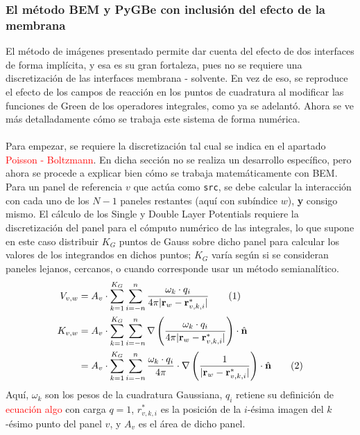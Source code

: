 \documentclass[12pt, notitlepage]{article}
\newcommand\numberthis{\addtocounter{equation}{1}\tag{\theequation}}
\numberwithin{equation}{section}
\begin{document}
\subsubsection{El método BEM y PyGBe con inclusión del efecto de la membrana}
El método de imágenes presentado permite dar cuenta del efecto de dos interfaces de forma implícita, y esa es su gran fortaleza, pues no se requiere una discretización de las interfaces membrana - solvente. En vez de eso, se reproduce el efecto de los campos de reacción en los puntos de cuadratura al modificar las funciones de Green de los operadores integrales, como ya se adelantó. Ahora se ve más detalladamente cómo se trabaja este sistema de forma numérica.\\\\
Para empezar, se requiere la discretización tal cual se indica en el apartado \textcolor{red}{Poisson - Boltzmann}. En dicha sección no se realiza un desarrollo específico, pero ahora se procede a explicar bien cómo se trabaja matemáticamente con BEM. Para un panel de referencia $v$ que actúa como \texttt{src}, se debe calcular la interacción con cada uno de los $N-1$ paneles restantes (aquí con subíndice $w$), \textbf{y} consigo mismo. El cálculo de los Single y Double Layer Potentials requiere la discretización del panel para el cómputo numérico de las integrales, lo que supone en este caso distribuir $K_G$ puntos de Gauss sobre dicho panel para calcular los valores de los integrandos en dichos puntos; $K_G$ varía según si se consideran paneles lejanos, cercanos, o cuando corresponde usar un método semianalítico.
\begin{align*}
V_{v,w} &= A_v\cdot\sum_{k=1}^{K_G}\sum_{i=-n}^{n}\frac{\omega_k\cdot q_i}{4\pi|\mathbf{r}_w - \mathbf{r}_{v,k,i}^*|} \numberthis\\
K_{v,w} &= A_v\cdot\sum_{k=1}^{K_G}\sum_{i=-n}^{n}\nabla\left(\frac{\omega_k\cdot q_i}{4\pi|\mathbf{r}_w - \mathbf{r}_{v,k,i}^*|}\right)\cdot\hat{\mathbf{n}} \\
&= A_v\cdot\sum_{k=1}^{K_G}\sum_{i=-n}^{n}\frac{\omega_k\cdot q_i}{4\pi}\cdot\nabla\left(\frac{1}{|\mathbf{r}_w - \mathbf{r}_{v,k,i}^*|}\right)\cdot\hat{\mathbf{n}}\numberthis
\end{align*}
Aquí, $\omega_k$ son los pesos de la cuadratura Gaussiana, $q_i$ retiene su definición de \textcolor{red}{ecuación algo} con carga $q = 1$, $r_{v,k,i}^*$ es la posición de la $i$-ésima imagen del $k$-ésimo punto del panel $v$, y $A_v$ es el área de dicho panel.\\\\
\end{document}
